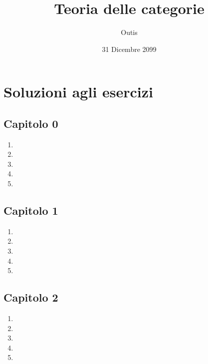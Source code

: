 \documentclass[ paper=a4
              , pagesize
              , fontsize=12pt
              , twoside=true
              , BCOR=5mm
              , DIV=calc
              , bibliography=totoc
              , final
              , version=last
              ]{scrbook}
\begin{document}
\frontmatter

\title{Teoria delle categorie}
\author{Outis}
\date{31 Dicembre 2099}
\publishers{Casa editrice}
\uppertitleback{Dettagli pubblicazione I?}
\lowertitleback{Dettagli pubblicazione II?}
\dedication{A Lawvere, per la sua gentilezza}

\maketitle

\tableofcontents

\mainmatter











\appendix

\clearpage

\backmatter
\chapter{Soluzioni agli esercizi}
\section*{Capitolo 0}
\begin{enumerate}
    \item
    \item
    \item
    \item
    \item
\end{enumerate}
\section*{Capitolo 1}
\begin{enumerate}
    \item
    \item
    \item
    \item
    \item
\end{enumerate}
\section*{Capitolo 2}
\begin{enumerate}
    \item
    \item
    \item
    \item
    \item
\end{enumerate}
\end{document}
